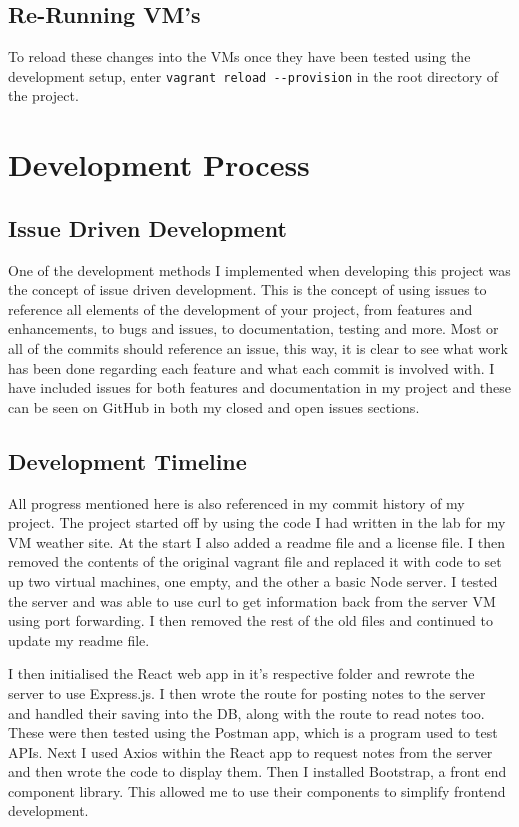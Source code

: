 \documentclass[12pt]{extarticle}
\begin{document}
\subsection{Re-Running VM's}
To reload these changes into the VMs once they have been tested using the development setup, enter \lstinline|vagrant reload --provision| in the root directory of the project. 

\section{Development Process}
\subsection{Issue Driven Development}
One of the development methods I implemented when developing this project was the concept of issue driven development. This is the concept of using issues to reference all elements of the development of your project, from features and enhancements, to bugs and issues, to documentation, testing and more. Most or all of the commits should reference an issue, this way, it is clear to see what work has been done regarding each feature and what each commit is involved with. I have included issues for both features and documentation in my project and these can be seen on GitHub in both my closed and open issues sections.
\subsection{Development Timeline}
All progress mentioned here is also referenced in my commit history of my project. The project started off by using the code I had written in the lab for my VM weather site. At the start I also added a readme file and a license file. I then removed the contents of the original vagrant file and replaced it with code to set up two virtual machines, one empty, and the other a basic Node server. I tested the server and was able to use curl to get information back from the server VM using port forwarding. I then removed the rest of the old files and continued to update my readme file. 

I then initialised the React web app in it's respective folder and rewrote the server to use Express.js. I then wrote the route for posting notes to the server and handled their saving into the DB, along with the route to read notes too. These were then tested using the Postman app, which is a program used to test APIs. Next I used Axios within the React app to request notes from the server and then wrote the code to display them. Then I installed Bootstrap, a front end component library. This allowed me to use their components to simplify frontend development. 
\end{document}
